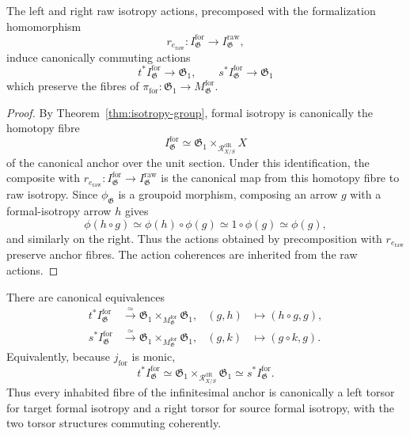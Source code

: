 \begin{proposition}
\label{prop:formal-isotropy-actions}
The left and right raw isotropy actions, precomposed with the formalization
homomorphism
\[
    r_{e_{\mathrm{raw}}}:
    I^{\mathrm{for}}_{\mathfrak G}
    \longrightarrow
    I^{\mathrm{raw}}_{\mathfrak G},
\]
induce canonically commuting actions
\[
    t^*I^{\mathrm{for}}_{\mathfrak G}
    \longrightarrow
    \mathfrak G_1,
    \qquad
    s^*I^{\mathrm{for}}_{\mathfrak G}
    \longrightarrow
    \mathfrak G_1
\]
which preserve the fibres of
$\pi_{\mathrm{for}}:\mathfrak G_1\to
M^{\mathrm{for}}_{\mathfrak G}$.
\end{proposition}

\begin{proof}
By Theorem~\ref{thm:isotropy-group}, formal isotropy is canonically the
homotopy fibre
\[
    I^{\mathrm{for}}_{\mathfrak G}
    \simeq
    \mathfrak G_1\times_{\mathcal R^{\mathrm{dR}}_{X/S}}X
\]
of the canonical anchor over the unit section.  Under this identification,
the composite with
$r_{e_{\mathrm{raw}}}:I^{\mathrm{for}}_{\mathfrak G}\to
I^{\mathrm{raw}}_{\mathfrak G}$
is the canonical map from this homotopy fibre to raw isotropy.  Since
$\phi_{\mathfrak G}$ is a groupoid morphism, composing an arrow $g$ with a
formal-isotropy arrow $h$ gives
\[
    \phi(h\circ g)
    \simeq
    \phi(h)\circ\phi(g)
    \simeq
    1\circ\phi(g)
    \simeq
    \phi(g),
\]
and similarly on the right.  Thus the actions obtained by precomposition with
$r_{e_{\mathrm{raw}}}$ preserve anchor fibres.  The action coherences are inherited from
the raw actions.
\end{proof}

\begin{theorem}
\label{thm:formal-bitorsor}
There are canonical equivalences
\[
\begin{aligned}
    t^*I^{\mathrm{for}}_{\mathfrak G}
    &\xrightarrow{\simeq}
    \mathfrak G_1
    \times_{M^{\mathrm{for}}_{\mathfrak G}}
    \mathfrak G_1,
    &
    (g,h)&\longmapsto(h\circ g,g),\\
    s^*I^{\mathrm{for}}_{\mathfrak G}
    &\xrightarrow{\simeq}
    \mathfrak G_1
    \times_{M^{\mathrm{for}}_{\mathfrak G}}
    \mathfrak G_1,
    &
    (g,k)&\longmapsto(g\circ k,g).
\end{aligned}
\]
Equivalently, because $j_{\mathrm{for}}$ is monic,
\[
    t^*I^{\mathrm{for}}_{\mathfrak G}
    \simeq
    \mathfrak G_1\times_{\mathcal R^{\mathrm{dR}}_{X/S}}\mathfrak G_1
    \simeq
    s^*I^{\mathrm{for}}_{\mathfrak G}.
\]
Thus every inhabited fibre of the infinitesimal anchor is canonically a
left torsor for target formal isotropy and a right torsor for source formal
isotropy, with the two torsor structures commuting coherently.
\end{theorem}

